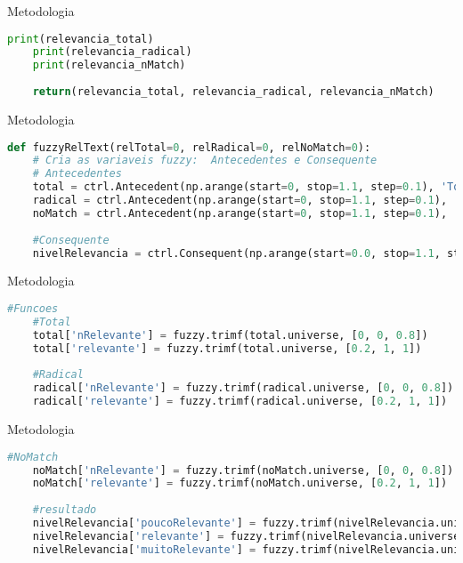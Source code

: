 \documentclass{beamer}
\begin{document}
	\begin{frame}[fragile]{Metodologia}
\begin{lstlisting}[language=Python, caption = Relevância de uma palavra(cont.)]
	print(relevancia_total)
	print(relevancia_radical)
	print(relevancia_nMatch)
	
	return(relevancia_total, relevancia_radical, relevancia_nMatch)
\end{lstlisting}
	\end{frame}

	\begin{frame}[fragile]{Metodologia}
\begin{lstlisting}[language=Python, caption = Lógica Fuzzy]
def fuzzyRelText(relTotal=0, relRadical=0, relNoMatch=0):
	# Cria as variaveis fuzzy:  Antecedentes e Consequente
	# Antecedentes
	total = ctrl.Antecedent(np.arange(start=0, stop=1.1, step=0.1), 'Total')
	radical = ctrl.Antecedent(np.arange(start=0, stop=1.1, step=0.1), 'Radical')
	noMatch = ctrl.Antecedent(np.arange(start=0, stop=1.1, step=0.1), 'NoMatch')
	
	#Consequente
	nivelRelevancia = ctrl.Consequent(np.arange(start=0.0, stop=1.1, step=0.1), 'Relevancia')
\end{lstlisting}
	\end{frame}

	\begin{frame}[fragile]{Metodologia}
\begin{lstlisting}[language=Python, caption = Lógica Fuzzy]
	#Funcoes
	#Total
	total['nRelevante'] = fuzzy.trimf(total.universe, [0, 0, 0.8])
	total['relevante'] = fuzzy.trimf(total.universe, [0.2, 1, 1])
	
	#Radical
	radical['nRelevante'] = fuzzy.trimf(radical.universe, [0, 0, 0.8])
	radical['relevante'] = fuzzy.trimf(radical.universe, [0.2, 1, 1])
\end{lstlisting}
	\end{frame}

	\begin{frame}[fragile]{Metodologia}
\begin{lstlisting}[language=Python, caption = Lógica Fuzzy(cont.)]	
	#NoMatch
	noMatch['nRelevante'] = fuzzy.trimf(noMatch.universe, [0, 0, 0.8])
	noMatch['relevante'] = fuzzy.trimf(noMatch.universe, [0.2, 1, 1])
	
	#resultado
	nivelRelevancia['poucoRelevante'] = fuzzy.trimf(nivelRelevancia.universe, [0, 0, 0.4])
	nivelRelevancia['relevante'] = fuzzy.trimf(nivelRelevancia.universe, [0.1, 0.5, 0.9])
	nivelRelevancia['muitoRelevante'] = fuzzy.trimf(nivelRelevancia.universe, [0.6, 1, 1])
\end{lstlisting}
	\end{frame}	
\end{document}
